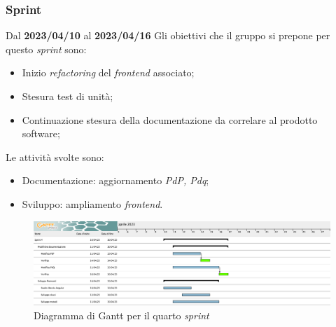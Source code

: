 \subsubsection{ Sprint}
Dal \textbf{2023/04/10} al \textbf{2023/04/16}
\newline
Gli obiettivi che il gruppo si prepone per questo \textit{sprint} sono:
\begin{itemize}
    \item Inizio \textit{refactoring} del \textit{frontend} associato;
    \item Stesura test di unità;
    \item Continuazione stesura della documentazione da correlare al prodotto software;
\end{itemize}
Le attività svolte sono:
\begin{itemize}
    \item Documentazione: aggiornamento \textit{PdP, Pdq};
    \item Sviluppo: ampliamento \textit{frontend}.
\end{itemize}
\begin{figure}[H]
    \centering
    \includegraphics[width=\textwidth]{src/img/Sprint 4.png}
    \caption{Diagramma di Gantt per il quarto \textit{sprint}}
\end{figure}
